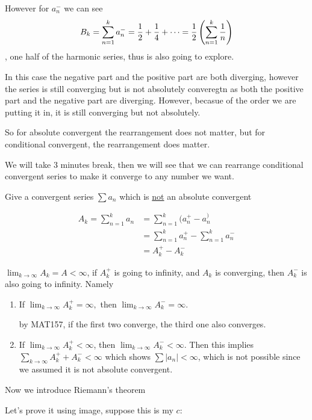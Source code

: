 \documentclass[11pt, sakura, night, 1in]{hw}
\begin{document}
However for $a_n^-$ we can see \[B_k = \sum_{n=1}^k a_n^- = \frac12 + \frac14 + \cdots = \frac12\left(\sum_{n=1}^k \frac1n\right)\], one half of the harmonic series, thus is also going to explore.

In this case the negative part and the positive part are both diverging, however the series is still converging but is not absolutely converegtn as both the positive part and the negative part are diverging. However, becasue of the order we are putting it in, it is still converging but not absolutely.

So for absolute convergent the rearrangement does not matter, but for conditional convergent, the rearrangement does matter.

We will take 3 minutes break, then we will see that we can rearrange conditional convergent series to make it converge to any number we want.

Give a convergent series $\sum a_n$ which is \underline{not} an absolute convergent

\begin{align*}
    A_k = \sum_{n=1}^k a_n &= \sum_{n=1}^k (a_n^+ - a_n^)\\
    &= \sum_{n=1}^k a_n^+ - \sum_{n=1}^k a_n^-\\
    &= A_k^+ - A_k^-
\end{align*}

$\lim_{k\to\infty} A_k = A<\infty$, if $A_k^+$ is going to infinity, and $A_k$ is converging, then $A_k^-$ is also going to infinity. Namely 
\begin{enumerate}
    \item If $\lim_{k\to\infty} A_k^+ = \infty,$ then $\lim_{k\to\infty} A_k^- = \infty$.

    by MAT157, if the first two converge, the third one also converges.
    \item If $\lim_{k\to\infty} A_k^+<\infty$, then $\lim_{k\to\infty} A_k^-<\infty$. Then this implies $\sum_{k\to\infty} A_k^+ + A_k^- < \infty$ which shows $\sum |a_n| < \infty$, which is not possible since we assumed it is not absolute convergent.
\end{enumerate}

Now we introduce Riemann's theorem


Let's prove it using image, suppose this is my $c$:
\end{document}

